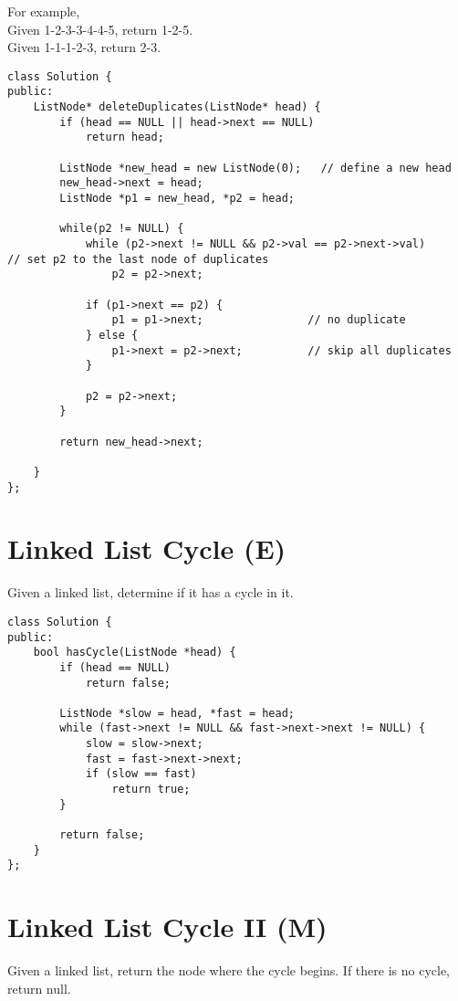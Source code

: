 For example,\\
Given 1-2-3-3-4-4-5, return 1-2-5.\\
Given 1-1-1-2-3, return 2-3. \\

\begin{lstlisting}
class Solution {
public:
    ListNode* deleteDuplicates(ListNode* head) {
        if (head == NULL || head->next == NULL)
            return head;
        
        ListNode *new_head = new ListNode(0);   // define a new head
        new_head->next = head;
        ListNode *p1 = new_head, *p2 = head;
        
        while(p2 != NULL) {
            while (p2->next != NULL && p2->val == p2->next->val)		// set p2 to the last node of duplicates
                p2 = p2->next;
            
            if (p1->next == p2) {
                p1 = p1->next;                // no duplicate
            } else {
                p1->next = p2->next;          // skip all duplicates
            }
            
            p2 = p2->next;
        }
        
        return new_head->next;
        
    }
};
\end{lstlisting}


\section{Linked List Cycle (E)}
Given a linked list, determine if it has a cycle in it. \\

\begin{lstlisting}
class Solution {
public:
    bool hasCycle(ListNode *head) {
        if (head == NULL)
            return false;
            
        ListNode *slow = head, *fast = head;
        while (fast->next != NULL && fast->next->next != NULL) {
            slow = slow->next;
            fast = fast->next->next;
            if (slow == fast)
                return true;
        }
        
        return false;
    }
};
\end{lstlisting}


\section{Linked List Cycle II (M)}
Given a linked list, return the node where the cycle begins. If there is no cycle, return null. \\
 
